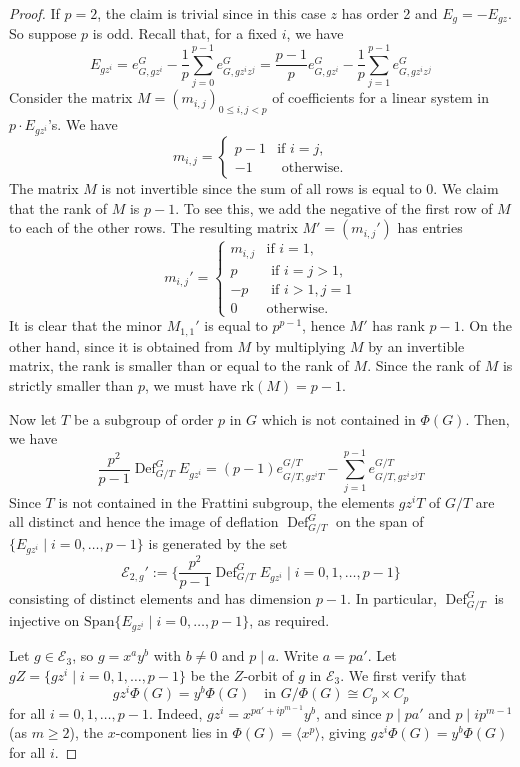 \documentclass[12pt]{article}
\theoremstyle{plain}
\theoremstyle{definition}
\newcommand{\defl}{\operatorname{Def}}
\begin{document}
\begin{proof}
If $p=2$, the claim is trivial since in this case $z$ has order 2 and $E_g = -E_{gz}$. So suppose $p$ is odd. Recall that, for a fixed $i$, we have
\[
E_{gz^i} = e_{G, gz^i}^G - \frac{1}{p}\sum_{j=0}^{p-1}e_{G, gz^iz^j}^G = \frac{p-1}{p}e_{G, gz^i}^G - \frac{1}{p}\sum_{j=1}^{p-1}e_{G, gz^iz^j}^G
\]
Consider the matrix $M=(m_{i, j})_{0\le i,j<p}$ of coefficients for a linear system in $p\cdot E_{gz^i}$'s. We have
\[
m_{i, j} = \begin{cases}
              p-1 & \text{if } i = j,\\
              -1 & \text{ otherwise.}
          \end{cases}  
\]
The matrix $M$ is not invertible since the sum of all rows is equal to 0. We claim that the rank of $M$ is $p-1$. To see this, we add the negative of the first row of $M$ to each of the other rows. The resulting matrix $M' = (m_{i, j}')$ has entries
\[
m_{i, j}' = \begin{cases}
              m_{i, j} & \text{if } i = 1,\\
              p & \text{ if } i=j>1,\\
              -p & \text{ if } i>1, j=1\\
              0 & \text{otherwise.}
          \end{cases}  
\]
It is clear that the minor $M_{1,1}'$ is equal to $p^{p-1}$, hence $M'$ has rank $p-1$. On the other hand, since it is obtained from $M$ by multiplying $M$ by an invertible matrix, the rank is smaller than or equal to the rank of $M$. Since the rank of $M$ is strictly smaller than $p$, we must have $\text{rk}(M) = p-1$. 

Now let $T$ be a subgroup of order $p$ in $G$ which is not contained in $\Phi(G)$. Then, we have
\[
\frac{p^2}{p-1}\defl^G_{G/T} E_{gz^i} = (p-1)e_{G/T, gz^iT}^{G/T} - \sum_{j=1}^{p-1}e_{G/T, gz^iz^jT}^{G/T}
\]
Since $T$ is not contained in the Frattini subgroup, the elements $gz^iT$ of $G/T$ are all distinct and hence the image of deflation $\defl^G_{G/T}$ on the span of $\{E_{gz^i} \mid i = 0,\ldots,p-1\}$ is generated by the set
\[
\mathcal E_{2,g}' := \Big\{ \frac{p^2}{p-1}\defl^G_{G/T} E_{gz^i}\mid i=0, 1, \ldots, p-1 \Big\}
\]
consisting of distinct elements and has dimension $p-1$. In particular, $\defl^G_{G/T}$ is injective on $\mathrm{Span}\{E_{gz^i} \mid i = 0,\ldots,p-1\}$, as required.

 Let $g \in \mathcal{E}_3$, so $g = x^a y^b$ with $b \neq 0$ and 
$p \mid a$. Write $a = pa'$. Let $gZ = \{gz^i \mid i = 0, 1, \ldots, p-1\}$ be the $Z$-orbit 
of $g$ in $\mathcal{E}_3$. We first verify that 
\[
gz^i\Phi(G) = y^b\Phi(G) \quad \text{in } G/\Phi(G) \cong C_p \times C_p
\]
for all $i = 0, 1, \ldots, p-1$. Indeed, $gz^i = x^{pa' + ip^{m-1}}y^b$, and since $p \mid pa'$ 
and $p \mid ip^{m-1}$ (as $m \geq 2$), the $x$-component lies in $\Phi(G) = \langle x^p\rangle$, 
giving $gz^i\Phi(G) = y^b\Phi(G)$ for all $i$.


\end{proof}
\end{document}
